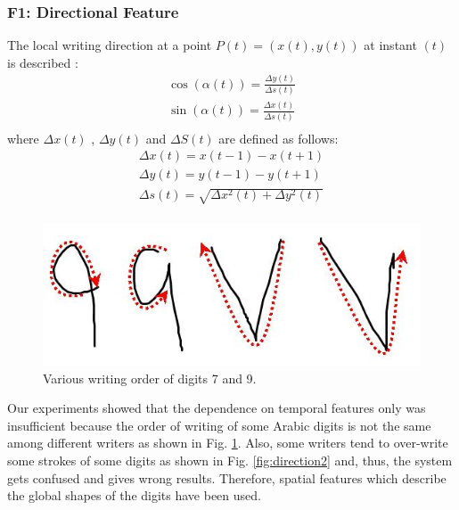 \documentclass[times, 10pt,twocolumn]{article}
\begin{document}
\subsubsection{ F1: Directional Feature}
     The local writing direction at a point $P(t)=(x(t),y(t))$ at instant $(t)$ is described  \cite{Jaeger2001}:
\[
\begin{array}{l}
 \cos (\alpha (t)) = \frac{{\Delta y(t)}}{{\Delta s(t)}} \\
 \sin (\alpha (t)) = \frac{{\Delta x(t)}}{{\Delta s(t)}} \\
 \end{array}
\]
where $\Delta x(t)$ , $\Delta y(t)$ and $\Delta S(t)$ are defined as follows:
\[
\begin{array}{l}
 \Delta x(t) = x(t - 1) - x(t + 1) \\
 \Delta y(t) = y(t - 1) - y(t + 1) \\
 \Delta s(t) = \sqrt {\Delta x^2 (t) + \Delta y^2 (t)}  \\
 \end{array}
\]


 \begin{figure}
	\centering
		\includegraphics[scale=0.21]{79}
	\caption[ Writing Direction] {Various writing order of digits 7 and 9.}
	\label{fig:direction}
\end{figure}

Our experiments showed that the dependence on temporal features only was insufficient because the order of writing of some Arabic digits is not the same among different writers as shown in Fig. \ref{fig:direction}. Also, some writers tend to over-write some strokes of some digits as shown in Fig. \ref{fig:direction2} and, thus, the system gets confused and gives wrong results. Therefore, spatial features which describe the global shapes of the digits have been used.


\end{document}
